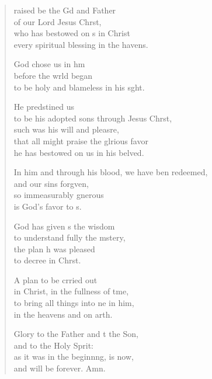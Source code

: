 \settowidth{\versewidth}{In him and through his blood, we have been redeemed, *}
\begin{verse}%
  \begin{patverse}
    raised be the Gd and Father\Med\\
    of our Lord Jesus Chr\pointup{\i}st,\\
    who has bestowed on s in Christ\Med\\
    every spiritual blessing in the havens.
    
    God chose us in h\pointup{\i}m\Flex\\
    before the wrld began\Med\\
    to be holy and blameless in his s\pointup{\i}ght.
    
    He predstined us\Med\\
    to be his adopted sons through Jesus Chr\pointup{\i}st,\Med\\
    such was his will and pleasre,\Flex\\
    that all might praise the glrious favor\Med\\
    he has bestowed on us in his belved.
    
    In him and through his blood, we have ben redeemed,\Med\\
    and our sins forg\pointup{\i}ven,\\
    so immeasurably gnerous\Med\\
    is God’s favor to s.
    
    God has given s the wisdom\Med\\
    to understand fully the mstery,\\
    the plan h was pleased\Med\\
    to decree in Chr\pointup{\i}st.
    
    A plan to be crried out\Med\\
    in Christ, in the fullness of t\pointup{\i}me,\\
    to bring all things into ne in him,\Med\\
    in the heavens and on arth.
    
    Glory to the Father and t the Son,\Med\\
    and to the Holy Sp\pointup{\i}rit:\\
    as it was in the beginn\pointup{\i}ng, is now,\Med\\
    and will be forever. Amn.
  \end{patverse}
\end{verse}
